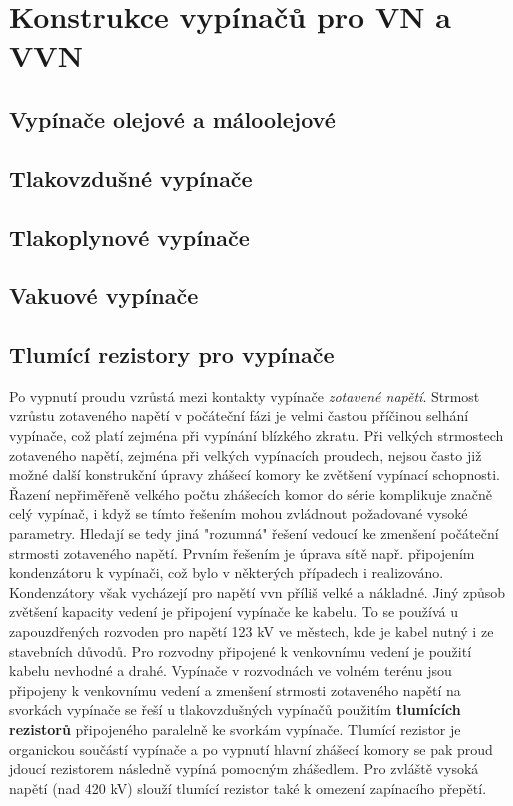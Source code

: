 \section{Konstrukce vypínačů pro VN a VVN}
  \subsection{Vypínače olejové a máloolejové}
  \subsection{Tlakovzdušné vypínače}
  \subsection{Tlakoplynové vypínače}
  \subsection{Vakuové vypínače}
  \newpage
  \subsection{Tlumící rezistory pro vypínače}
    Po vypnutí proudu vzrůstá mezi kontakty vypínače \emph{zotavené napětí}. Strmost vzrůstu zotaveného napětí v počáteční fázi je velmi častou příčinou selhání vypínače, což platí zejména při vypínání blízkého zkratu. Při velkých strmostech zotaveného napětí, zejména při velkých vypínacích proudech, nejsou často již možné další konstrukční úpravy zhášecí komory ke zvětšení vypínací schopnosti. Řazení nepřiměřeně velkého počtu zhášecích komor do série 
    komplikuje značně celý vypínač, i když se tímto řešením mohou zvládnout požadované vysoké parametry. Hledají se tedy jiná "rozumná" řešení vedoucí ke zmenšení počáteční strmosti zotaveného napětí. Prvním řešením je úprava sítě např. připojením kondenzátoru k vypínači, což bylo v některých případech i realizováno. Kondenzátory však vycházejí pro napětí vvn příliš velké a nákladné. Jiný způsob zvětšení kapacity vedení je připojení vypínače ke kabelu. 
    To se používá u zapouzdřených rozvoden pro napětí 123 kV ve městech, kde je kabel nutný i ze stavebních důvodů. Pro rozvodny připojené k venkovnímu vedení je použití kabelu nevhodné a drahé. Vypínače v rozvodnách ve volném terénu jsou připojeny k venkovnímu vedení a zmenšení strmosti zotaveného napětí na svorkách vypínače se řeší u tlakovzdušných vypínačů použitím \textbf{tlumících rezistorů} připojeného paralelně ke svorkám vypínače. Tlumící rezistor je organickou součástí vypínače a po vypnutí hlavní zhášecí komory se pak proud jdoucí rezistorem následně vypíná pomocným zhášedlem. Pro zvláště vysoká napětí (nad 420 kV) slouží tlumící rezistor také k omezení zapínacího přepětí.

